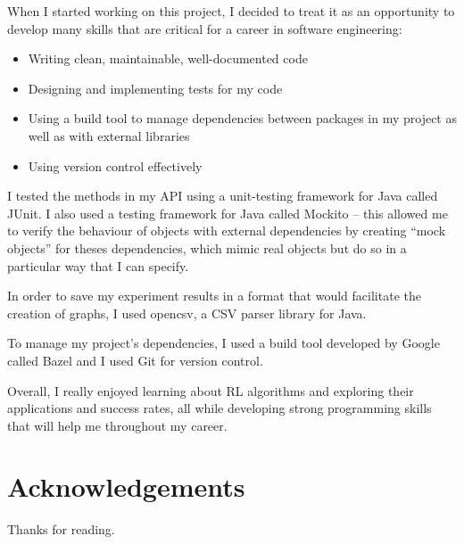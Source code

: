 \documentclass[11pt,a4paper]{report}
\begin{document}
When I started working on this project, I decided to treat it as an opportunity to develop many skills that are critical for a career in software engineering:

\begin{itemize}
	\item Writing clean, maintainable, well-documented code
	\item Designing and implementing tests for my code
	\item Using a build tool to manage dependencies between packages in my project as well as with external libraries
	\item Using version control effectively
\end{itemize}

I tested the methods in my API using a unit-testing framework for Java called JUnit. I also used a testing framework for Java called Mockito – this allowed me to verify the behaviour of objects with external dependencies by creating “mock objects” for theses dependencies, which mimic real objects but do so in a particular way that I can specify.

In order to save my experiment results in a format that would facilitate the creation of graphs, I used opencsv, a CSV parser library for Java.

To manage my project’s dependencies, I used a build tool developed by Google called Bazel and I used Git for version control.

Overall, I really enjoyed learning about RL algorithms and exploring their applications and success rates, all while developing strong programming skills that will help me throughout my career.


\chapter{Acknowledgements}

Thanks for reading.
\end{document}
